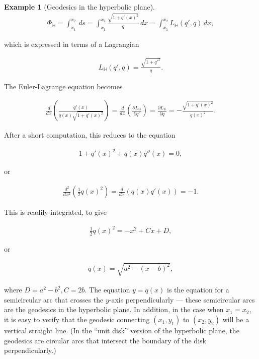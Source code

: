 \documentclass[11pt]{report}
\theoremstyle{plain}
\theoremstyle{definition}
\newtheorem{example}[thm]{Example}
\begin{document}
\begin{example}[Geodesics in the hyperbolic plane]
\begin{align*}
\Phi_{\mathbb{H}} = \int_{x_1}^{x_2} \,ds = \int_{x_1}^{x_2} \frac{\sqrt{1+q'(x)^2}}{q}\,dx
= \int_{x_1}^{x_2} L_{\mathbb{H}}(q',q)\,dx,
\end{align*}

which is expressed in terms of a Lagrangian

\begin{align*}
L_{\mathbb{H}}(q',q) = \frac{\sqrt{1+q'^2}}{q}.
\end{align*}

The Euler-Lagrange equation becomes

\begin{align*}
\frac{d}{dx}\left(\frac{q'(x)}{q(x)\sqrt{1+q'(x)^2}}\right)=
\frac{d}{dx}\left(\frac{\partial L_{\mathbb{H}}}{\partial q'} \right) = \frac{\partial L_{\mathbb{H}}}{\partial q} = -\frac{\sqrt{1+q'(x)^2}}{q(x)^2}.
\end{align*}

After a short computation, this reduces to the
equation

\begin{align*}
1+q'(x)^2+q(x)q''(x) = 0,
\end{align*}

or

\begin{align*}
\frac{d^2}{dx^2}\left(\tfrac12 q(x)^2\right)
= \frac{d}{dx}\left(q(x) q'(x)\right) = -1.
\end{align*}

This is readily integrated, to give

\begin{align*}
\tfrac12 q(x)^2 = -x^2 + Cx + D,
\end{align*}

or

\begin{align*}
q(x) = \sqrt{a^2 - (x-b)^2},
\end{align*}

where $D=a^2-b^2, C=2b$. The equation $y=q(x)$ is the
equation for a semicircular arc that crosses the
$y$-axis perpendicularly --- these semicircular arcs
are the geodesics in the hyperbolic plane. In
addition, in the case when $x_1=x_2$, it is easy to
verify that the geodesic connecting $(x_1,y_1)$ to
$(x_2,y_2)$ will be a vertical straight line. (In the
``unit disk'' version of the hyperbolic plane, the
geodesics are circular arcs that intersect the
boundary of the disk perpendicularly.)
\end{example}
\end{document}
